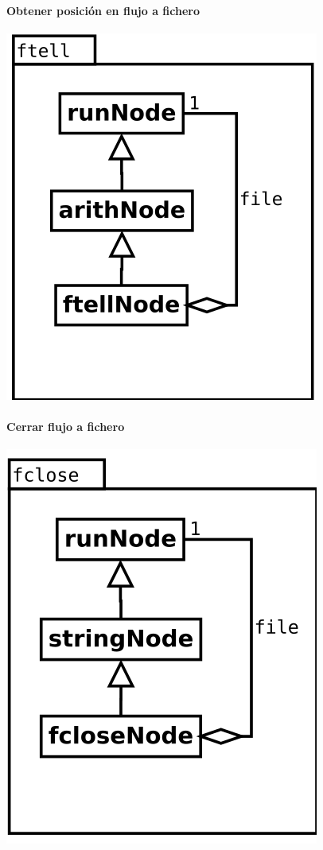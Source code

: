 \begin{multicols}{2}
\paragraph {Obtener posición en flujo a fichero} 
   \begin{center}
   \includegraphics[scale=0.4]{ftell.png} \\
   \end{center}

   \paragraph {Cerrar flujo a fichero} 
   \begin{center}
   \includegraphics[scale=0.4]{fclose.png} \\
   \end{center}


\end{multicols}
